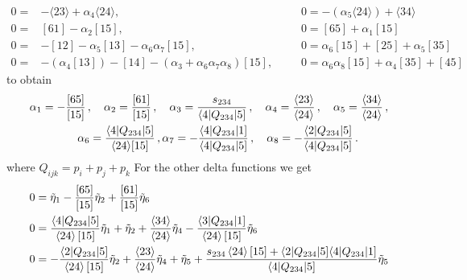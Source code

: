 \documentclass[letter,11pt]{article}
\newcommand{\ab}[1]{\langle #1 \rangle}
\newcommand{\sqb}[1]{[ #1 ]}
\newcommand{\aMs}[3]{\langle #1|#2|#3]}  		%
\newcommand{\sab}[1]{s_{#1}}
\newcommand{\twhite}[1]{\textcolor{white}{#1}}
\begin{document}
\begin{equation}
	\begin{aligned}
0=&-\langle 2 3 \rangle + \alpha_{4} \langle 2 4 \rangle,~~~~&&
0=-(\alpha_{5} \langle 2 4 \rangle) + \langle 3 4 \rangle
\\
0=&\left[ 6 1 \right] - \alpha_{2} \left[ 1 5 \right],~~~~&&
0=\left[ 6 5 \right] + \alpha_{1} \left[ 1 5 \right]
\\
0=&-\left[ 1 2 \right] - \alpha_{5} \left[ 1 3 \right] - \alpha_{6} \alpha_{7} \left[ 1 5 \right],~~~~&&
0=\alpha_{6} \left[ 1 5 \right] + \left[ 2 5 \right] + \alpha_{5} \left[ 3 5 \right]
\\
0=&-(\alpha_{4} \left[ 1 3 \right]) - \left[ 1 4 \right] - ( \alpha_{3} + \alpha_{6} \alpha_{7} \alpha_{8}) \left[ 1 5 \right],~~~~&&
0=\alpha_{6} \alpha_{8} \left[ 1 5 \right] + \alpha_{4} \left[ 3 5 \right] + \left[ 4 5 \right]
	\end{aligned}
\end{equation}
to obtain
\begin{align*}
	& \alpha_1 = -\frac{[65]}{[15]}\,, \quad \alpha_2 = \frac{[61]}{[15]}\,, \quad \alpha_3 = \frac{\sab{234}}{\aMs{4}{Q_{234}}{5}}\,, \quad \alpha_4 = \frac{\ab{23}}{\ab{24}}\,, \quad
	\alpha_5 = \frac{\ab{34}}{\ab{24}}\,, \\ 
	& \twhite{.}\hspace{1.4cm} 
	\alpha_6 = \frac{\aMs{4}{Q_{234}}{5}}{\ab{24}\sqb{15}}\,, \alpha_7 = -\frac{\aMs{4}{Q_{234}}{1}}{\aMs{4}{Q_{234}}{5}}\,,\quad
	\alpha_8 = - \frac{\aMs{2}{Q_{234}}{5}}{\aMs{4}{Q_{234}}{5}}\,.
\end{align*}
where $Q_{ijk}=p_i+p_j+p_k$
For the other delta functions we get
\begin{equation}
	\begin{aligned}
	 0&=\tilde\eta_1-\frac{[65]}{[15]}\tilde\eta_2+\frac{[61]}{[15]}\tilde\eta_6\\
		0&= \frac{\langle4|Q_{234}|5]}{\expval{24}[15]}\tilde\eta_1+\tilde\eta_2+\frac{\expval{34}}{\expval{24}}\tilde\eta_4-\frac{\langle3|Q_{234}|1]}{\expval{24}[15]}\tilde\eta_6
		\\
		0&= -\frac{\langle2|Q_{234}|5]}{\expval{24}[15]}\tilde\eta_2+\frac{\expval{23}}{\expval{24}}\tilde\eta_4+\tilde\eta_5+\frac{s_{234}\expval{24}[15]+\langle2|Q_{234}|5]\langle4|Q_{234}|1] }{\langle4|Q_{234}|5]}
\tilde\eta_5
	\end{aligned}
\end{equation}
\end{document}
